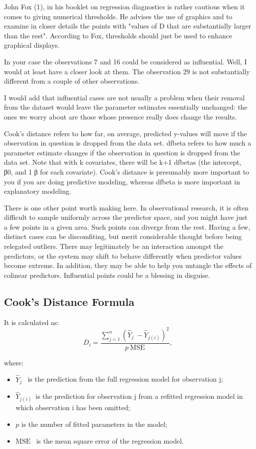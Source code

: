 \documentclass[residuals.tex]{subfiles}
\begin{document}
John Fox (1), in his booklet on regression diagnostics is rather cautious when it comes to giving numerical thresholds. He advises the use of graphics and to examine in closer details the points with "values of D that are substantially larger than the rest". According to Fox, thresholds should just be used to enhance graphical displays.

In your case the observations 7 and 16 could be considered as influential. Well, I would at least have a closer look at them. The observation 29 is not substantially different from a couple of other observations.

I would add that influential cases are not usually a problem when their removal from the dataset would leave the parameter estimates essentially unchanged: the ones we worry about are those whose presence really does change the results. 


Cook's distance refers to how far, on average, predicted y-values will move if the observation in question is dropped from the data set. dfbeta refers to how much a parameter estimate changes if the observation in question is dropped from the data set. Note that with k covariates, there will be k+1 dfbetas (the intercept, β0, and 1 β for each covariate). Cook's distance is presumably more important to you if you are doing predictive modeling, whereas dfbeta is more important in explanatory modeling.

There is one other point worth making here. In observational research, it is often difficult to sample uniformly across the predictor space, and you might have just a few points in a given area. Such points can diverge from the rest. Having a few, distinct cases can be discomfiting, but merit considerable thought before being relegated outliers. There may legitimately be an interaction amongst the predictors, or the system may shift to behave differently when predictor values become extreme. In addition, they may be able to help you untangle the effects of colinear predictors. Influential points could be a blessing in disguise.
\newpage 

\subsection*{Cook's Distance Formula}
It is calculated as:
\[D_i = \frac{ \sum_{j=1}^n (\hat Y_j\ - \hat Y_{j(i)})^2 }{p \ \mathrm{MSE}},
\]

where:
\begin{itemize}
\item $\hat Y_j$ \, is the prediction from the full regression model for observation j;
\item $\hat Y_{j(i)}$\, is the prediction for observation j from a refitted regression model in which observation i has been omitted;
\item $p$ is the number of fitted parameters in the model;
\item $\mathrm{MSE} $ \, is the mean square error of the regression model.

\end{itemize}
\end{document}
